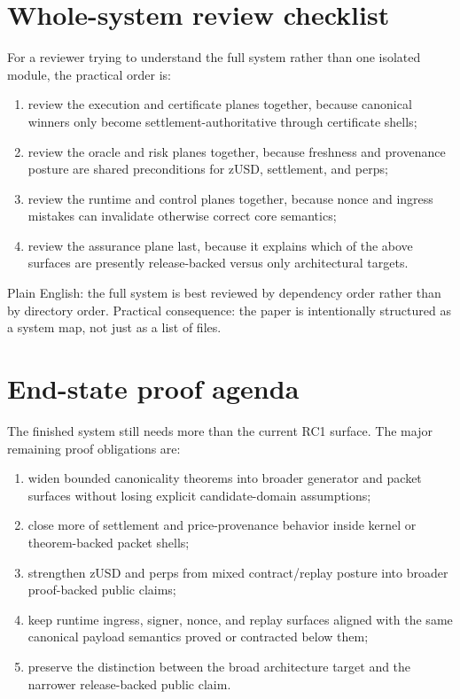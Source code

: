\documentclass[10pt]{extarticle}
\begin{document}
\section{Whole-system review checklist}
For a reviewer trying to understand the full system rather than one isolated
module, the practical order is:
\begin{enumerate}
  \item review the execution and certificate planes together, because canonical
  winners only become settlement-authoritative through certificate shells;
  \item review the oracle and risk planes together, because freshness and
  provenance posture are shared preconditions for zUSD, settlement, and perps;
  \item review the runtime and control planes together, because nonce and
  ingress mistakes can invalidate otherwise correct core semantics;
  \item review the assurance plane last, because it explains which of the above
  surfaces are presently release-backed versus only architectural targets.
\end{enumerate}
Plain English: the full system is best reviewed by dependency order rather
than by directory order.
Practical consequence: the paper is intentionally structured as a system map,
not just as a list of files.

\section{End-state proof agenda}
The finished system still needs more than the current RC1 surface. The major
remaining proof obligations are:
\begin{enumerate}
  \item widen bounded canonicality theorems into broader generator and packet
  surfaces without losing explicit candidate-domain assumptions;
  \item close more of settlement and price-provenance behavior inside kernel or
  theorem-backed packet shells;
  \item strengthen zUSD and perps from mixed contract/replay posture into
  broader proof-backed public claims;
  \item keep runtime ingress, signer, nonce, and replay surfaces aligned with
  the same canonical payload semantics proved or contracted below them;
  \item preserve the distinction between the broad architecture target and the
  narrower release-backed public claim.
\end{enumerate}
\end{document}
